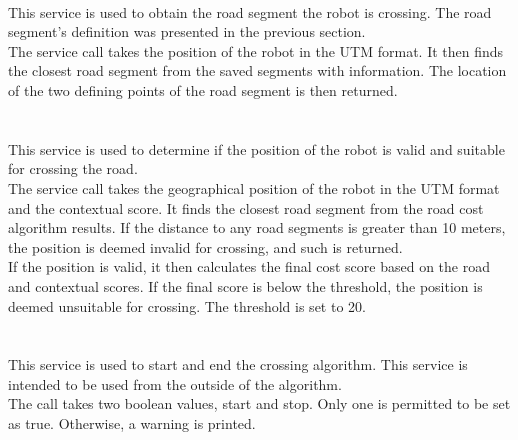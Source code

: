         \\
            This service is used to obtain the road segment the robot is crossing. The road segment's definition was presented in the previous section.\\
            The service call takes the position of the robot in the UTM format. It then finds the closest road segment from the saved segments with information. The location of the two defining points of the road segment is then returned.\\\\
        \\
            This service is used to determine if the position of the robot is valid and suitable for crossing the road.\\
            The service call takes the geographical position of the robot in the UTM format and the contextual score. It finds the closest road segment from the road cost algorithm results. If the distance to any road segments is greater than 10 meters, the position is deemed invalid for crossing, and such is returned.\\
            If the position is valid, it then calculates the final cost score based on the road and contextual scores. If the final score is below the threshold, the position is deemed unsuitable for crossing. The threshold is set to 20.\\\\
        \\
            This service is used to start and end the crossing algorithm. This service is intended to be used from the outside of the algorithm.\\
            The call takes two boolean values, start and stop. Only one is permitted to be set as true. Otherwise, a warning is printed.

